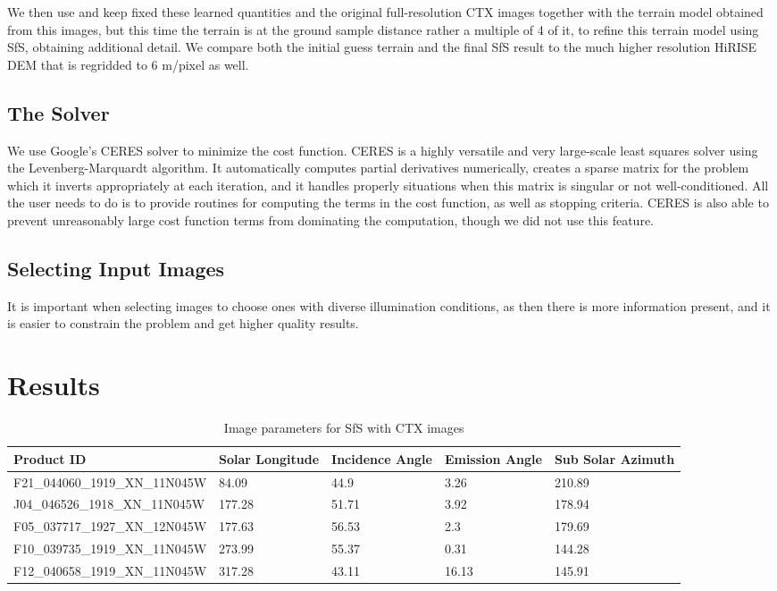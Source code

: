 \documentclass[draft,linenumbers]{agujournal}
\begin{document}
We then use and keep fixed these learned quantities and the original full-resolution CTX images together with the terrain model obtained from this images, but this time the terrain is at the ground sample distance rather a multiple of 4 of it, to refine this terrain model using SfS, obtaining additional detail. We compare both the initial guess terrain and the final SfS result to the much higher resolution HiRISE DEM that is regridded to 6 m/pixel as well. 

\subsection{The Solver}

We use Google's CERES solver \citep{agarwal2012ceres} to minimize
the cost function. CERES is a highly versatile and very large-scale
least squares solver using the Levenberg-Marquardt algorithm. It
automatically computes partial derivatives numerically, creates a
sparse matrix for the problem which it inverts appropriately at
each iteration, and it handles properly situations when this matrix
is singular or not well-conditioned. All the user needs to do is
to provide routines for computing the terms in the cost function,
as well as stopping criteria. CERES is also able to prevent
unreasonably large cost function terms from dominating the computation,
though we did not use this feature.

\subsection{Selecting Input Images}

It is important when selecting images to choose ones with diverse illumination conditions, as then there is more information present, and it is easier to constrain the problem and get higher quality results. 

\section{Results}

\begin{table}[h]
\caption{Image parameters for SfS with CTX images}
\label{ctximages}
\centering
\begin{tabular}{lp{2cm}p{2cm}p{2cm}p{2cm}}
\hline
Product ID & Solar Longitude & Incidence Angle & Emission Angle & Sub Solar Azimuth \\
\hline
 F21\_044060\_1919\_XN\_11N045W  &   84.09  & 44.9  & 3.26   & 210.89 \\ 
 J04\_046526\_1918\_XN\_11N045W  &  177.28  & 51.71 & 3.92   & 178.94 \\ 
 F05\_037717\_1927\_XN\_12N045W  &  177.63  & 56.53 & 2.3    & 179.69 \\
 F10\_039735\_1919\_XN\_11N045W  &  273.99  & 55.37 & 0.31   & 144.28 \\ 
 F12\_040658\_1919\_XN\_11N045W  &  317.28  & 43.11 & 16.13  & 145.91 \\
\hline    
\end{tabular}
\end{table}
\end{document}
